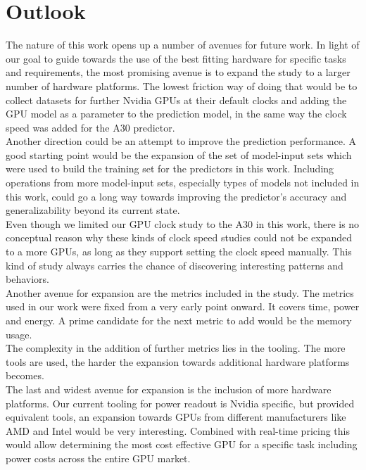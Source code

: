 


\section{Outlook}
The nature of this work opens up a number of avenues for future work. In light of our goal to guide towards the use of the best fitting hardware for specific tasks and requirements, the most promising avenue is to expand the study to a larger number of hardware platforms. The lowest friction way of doing that would be to collect datasets for further Nvidia GPUs at their default clocks and adding the GPU model as a parameter to the prediction model, in the same way the clock speed was added for the A30 predictor. \\
Another direction could be an attempt to improve the prediction performance.
A good starting point would be the expansion of the set of model-input sets which were used to build the training set for the predictors in this work. Including operations from more model-input sets, especially types of models not included in this work, could go a long way towards improving the predictor's accuracy and generalizability beyond its current state. \\
Even though we limited our GPU clock study to the A30 in this work, there is no conceptual reason why these kinds of clock speed studies could not be expanded to a more GPUs, as long as they support setting the clock speed manually. This kind of study always carries the chance of discovering interesting patterns and behaviors.\\
Another avenue for expansion are the metrics included in the study. The metrics used in our work were fixed from a very early point onward. It covers time, power and energy. A prime candidate for the next metric to add would be the memory usage. \\
The complexity in the addition of further metrics lies in the tooling. The more tools are used, the harder the expansion towards additional hardware platforms becomes. \\
The last and widest avenue for expansion is the inclusion of more hardware platforms. Our current tooling for power readout is Nvidia specific, but provided equivalent tools, an expansion towards GPUs from different manufacturers like AMD and Intel would be very interesting. Combined with real-time pricing this would allow determining the most cost effective GPU for a specific task including power costs across the entire GPU market. \\
